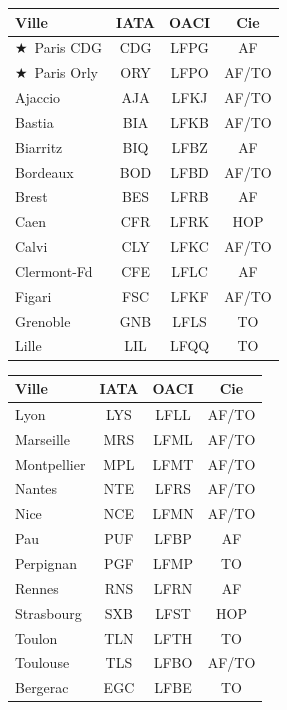 \documentclass[9pt,a4paper,landscape]{article}
\newcommand{\CAP}{\textcolor{capgold}{$\bigstar$}}
\begin{document}
\noindent
\begin{minipage}[t]{0.48\textwidth}
\scriptsize
\begin{tabular}{@{}l c c c@{}}
\toprule
\textbf{Ville} & \textbf{IATA} & \textbf{OACI} & \textbf{Cie} \\
\midrule
\rowcolor{aflight}\CAP\ Paris CDG & CDG & LFPG & AF \\
\CAP\ Paris Orly & ORY & LFPO & AF/TO \\
\rowcolor{aflight} Ajaccio & AJA & LFKJ & AF/TO \\
Bastia & BIA & LFKB & AF/TO \\
\rowcolor{aflight} Biarritz & BIQ & LFBZ & AF \\
Bordeaux & BOD & LFBD & AF/TO \\
\rowcolor{aflight} Brest & BES & LFRB & AF \\
Caen & CFR & LFRK & HOP \\
\rowcolor{aflight} Calvi & CLY & LFKC & AF/TO \\
Clermont-Fd & CFE & LFLC & AF \\
\rowcolor{aflight} Figari & FSC & LFKF & AF/TO \\
Grenoble & GNB & LFLS & TO \\
\rowcolor{aflight} Lille & LIL & LFQQ & TO \\
\bottomrule
\end{tabular}
\end{minipage}\hfill
\begin{minipage}[t]{0.48\textwidth}
\scriptsize
\begin{tabular}{@{}l c c c@{}}
\toprule
\textbf{Ville} & \textbf{IATA} & \textbf{OACI} & \textbf{Cie} \\
\midrule
\rowcolor{aflight} Lyon & LYS & LFLL & AF/TO \\
Marseille & MRS & LFML & AF/TO \\
\rowcolor{aflight} Montpellier & MPL & LFMT & AF/TO \\
Nantes & NTE & LFRS & AF/TO \\
\rowcolor{aflight} Nice & NCE & LFMN & AF/TO \\
Pau & PUF & LFBP & AF \\
\rowcolor{aflight} Perpignan & PGF & LFMP & TO \\
Rennes & RNS & LFRN & AF \\
\rowcolor{aflight} Strasbourg & SXB & LFST & HOP \\
Toulon & TLN & LFTH & TO \\
\rowcolor{aflight} Toulouse & TLS & LFBO & AF/TO \\
Bergerac & EGC & LFBE & TO \\
\bottomrule
\end{tabular}
\end{minipage}
\end{document}
